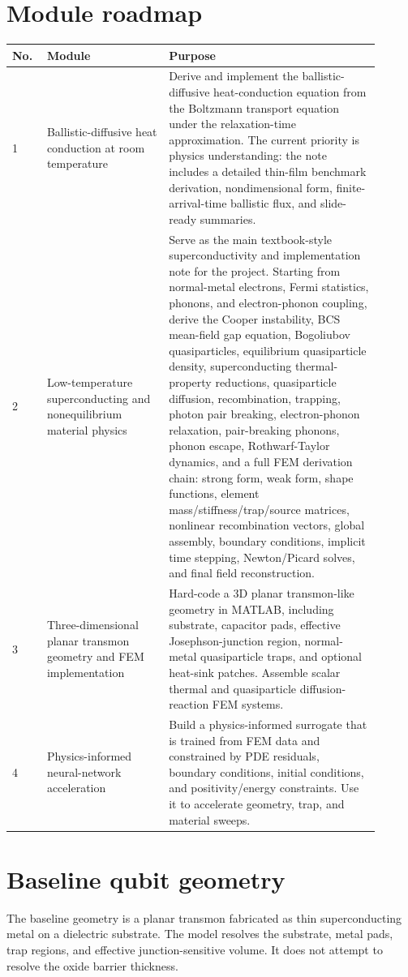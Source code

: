 \documentclass[11pt]{article}
\begin{document}
\section{Module roadmap}
\begin{longtable}{p{0.08\linewidth} p{0.30\linewidth} p{0.52\linewidth}}
\toprule
\textbf{No.} & \textbf{Module} & \textbf{Purpose}\\
\midrule
1 & Ballistic-diffusive heat conduction at room temperature & Derive and implement the ballistic-diffusive heat-conduction equation from the Boltzmann transport equation under the relaxation-time approximation. The current priority is physics understanding: the note includes a detailed thin-film benchmark derivation, nondimensional form, finite-arrival-time ballistic flux, and slide-ready summaries.\\
2 & Low-temperature superconducting and nonequilibrium material physics & Serve as the main textbook-style superconductivity and implementation note for the project. Starting from normal-metal electrons, Fermi statistics, phonons, and electron-phonon coupling, derive the Cooper instability, BCS mean-field gap equation, Bogoliubov quasiparticles, equilibrium quasiparticle density, superconducting thermal-property reductions, quasiparticle diffusion, recombination, trapping, photon pair breaking, electron-phonon relaxation, pair-breaking phonons, phonon escape, Rothwarf-Taylor dynamics, and a full FEM derivation chain: strong form, weak form, shape functions, element mass/stiffness/trap/source matrices, nonlinear recombination vectors, global assembly, boundary conditions, implicit time stepping, Newton/Picard solves, and final field reconstruction.\\
3 & Three-dimensional planar transmon geometry and FEM implementation & Hard-code a 3D planar transmon-like geometry in MATLAB, including substrate, capacitor pads, effective Josephson-junction region, normal-metal quasiparticle traps, and optional heat-sink patches. Assemble scalar thermal and quasiparticle diffusion-reaction FEM systems.\\
4 & Physics-informed neural-network acceleration & Build a physics-informed surrogate that is trained from FEM data and constrained by PDE residuals, boundary conditions, initial conditions, and positivity/energy constraints. Use it to accelerate geometry, trap, and material sweeps.\\
\bottomrule
\end{longtable}

\section{Baseline qubit geometry}
The baseline geometry is a planar transmon fabricated as thin superconducting metal on a dielectric substrate. The model resolves the substrate, metal pads, trap regions, and effective junction-sensitive volume. It does not attempt to resolve the oxide barrier thickness.
\end{document}
